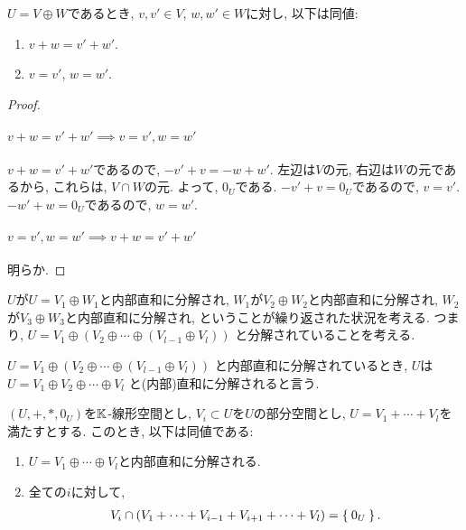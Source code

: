 \begin{prop}
  $U=V\oplus W$であるとき,
  $v,v'\in V$,
  $w,w'\in W$に対し, 以下は同値:
  \begin{enumerate}
  \item $v\plus w=v'\plus w'$.
  \item $v=v'$, $w=w'$.
  \end{enumerate}
\end{prop}
\begin{proof}
  \paragraph{$v\plus w=v'\plus w'\implies v=v', w=w'$}
  $v\plus w=v'\plus w'$であるので,
  $-v'\plus v=-w\plus w'$.
  左辺は$V$の元, 右辺は$W$の元であるから,
  これらは, $V\cap W$の元.
  よって, $0_U$である.
  $-v'\plus v=0_U$であるので, $v=v'$.
  $-w'\plus w=0_U$であるので, $w=w'$.
  
  \paragraph{$v=v', w=w'\implies v\plus w=v'\plus w'$}
  明らか.
\end{proof}


$U$が$U=V_1\oplus W_1$と内部直和に分解され,
$W_1$が$V_2\oplus W_2$と内部直和に分解され,
$W_2$が$V_3\oplus W_3$と内部直和に分解され,
ということが繰り返された状況を考える.
つまり,
$U=V_1\oplus (V_2\oplus \cdots \oplus(V_{l-1}\oplus V_l))$
と分解されていることを考える.
\begin{definition}
$U=V_1\oplus (V_2\oplus \cdots \oplus(V_{l-1}\oplus V_l))$
と内部直和に分解されているとき,
$U$は$U=V_1\oplus V_2\oplus \cdots \oplus V_l$
と(内部)直和に分解されると言う.
\end{definition}
\begin{prop}
  $(U,\plus,\ast,0_U)$を$\mathbb{K}$-線形空間とし, $V_i\subset U$を$U$の部分空間とし,
  $U=V_1+\cdots+ V_l$を満たすとする.
  このとき, 以下は同値である:
  \begin{enumerate}
  \item $U=V_1\oplus \cdots \oplus V_l$と内部直和に分解される.
  \item 全ての$i$に対して,
    \begin{align*}
      V_i \cap (V_1+\cdots+ V_{i-1}+V_{i+1}+\cdots+ V_{l})=\Set{0_U}.
    \end{align*}
  \end{enumerate}
\end{prop}


